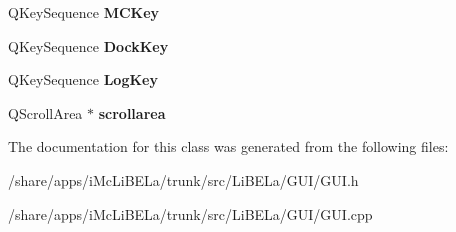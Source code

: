 \begin{DoxyCompactItemize}
\item 
\hypertarget{classGUI_a3e62efca2bbca1de085703d1a2a70ea1}{
QKeySequence {\bfseries MCKey}}
\label{classGUI_a3e62efca2bbca1de085703d1a2a70ea1}

\item 
\hypertarget{classGUI_a5d833a9750dcb5ee8d0423892217f828}{
QKeySequence {\bfseries DockKey}}
\label{classGUI_a5d833a9750dcb5ee8d0423892217f828}

\item 
\hypertarget{classGUI_ad885b2dbe54e0b321afaee52b58e344f}{
QKeySequence {\bfseries LogKey}}
\label{classGUI_ad885b2dbe54e0b321afaee52b58e344f}

\item 
\hypertarget{classGUI_adb68d1e08edcf2b22342f70050ed16c2}{
QScrollArea $\ast$ {\bfseries scrollarea}}
\label{classGUI_adb68d1e08edcf2b22342f70050ed16c2}

\end{DoxyCompactItemize}


The documentation for this class was generated from the following files:\begin{DoxyCompactItemize}
\item 
/share/apps/iMcLiBELa/trunk/src/LiBELa/GUI/GUI.h\item 
/share/apps/iMcLiBELa/trunk/src/LiBELa/GUI/GUI.cpp\end{DoxyCompactItemize}
